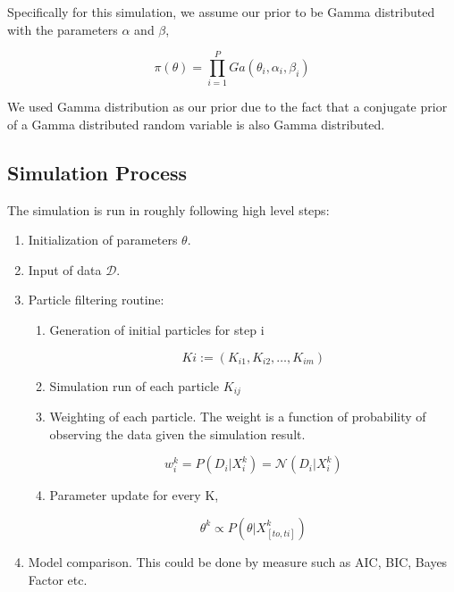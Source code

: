 \documentclass{bioinfo}
\begin{document}
Specifically for this simulation, we assume our prior to be Gamma distributed with the parameters $\alpha$ and $\beta$,

\begin{equation}
\pi(\theta) = \prod_{i=1}^{P} Ga(\theta_i, \alpha_i, \beta_i)\label{eq:10}
\end{equation}

We used Gamma distribution as our prior due to the fact that a conjugate prior of a Gamma distributed random variable is also Gamma distributed.

\subsection{Simulation Process}

The simulation is run in roughly following high level steps:

\begin{enumerate}
\item Initialization of parameters $\theta$.
\item Input of data $\mathcal{D}$.
\item Particle filtering routine:

\begin{enumerate}
\item Generation of initial particles for step i

\begin{equation}
Ki := (K_{i1}, K_{i2}, \dots, K_{im})\label{eq:11}
\end{equation}

\item Simulation run of each particle $K_{ij}$
\item Weighting of each particle. The weight is a function of probability of observing the data given the simulation result.

\begin{equation}
w_i^k = P(D_i | X_i^k) = \mathcal{N}(D_i | X_i^k)\label{eq:12}
\end{equation}

\item Parameter update for every K,

\begin{equation}
\theta^k \propto P(\theta | X^k_{[to, ti]})\label{eq:13}
\end{equation}

\end{enumerate}

\item Model comparison. This could be done by measure such as AIC, BIC, Bayes Factor etc.

\end{enumerate}
\end{document}
